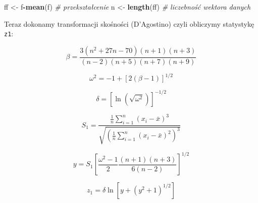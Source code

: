 \documentclass[polish,]{book}
\newenvironment{Shaded}{\begin{snugshade}}{\end{snugshade}}
\newcommand{\CommentTok}[1]{\textcolor[rgb]{0.56,0.35,0.01}{\textit{#1}}}
\newcommand{\KeywordTok}[1]{\textcolor[rgb]{0.13,0.29,0.53}{\textbf{#1}}}
\newcommand{\NormalTok}[1]{#1}
\newcommand{\OperatorTok}[1]{\textcolor[rgb]{0.81,0.36,0.00}{\textbf{#1}}}
\newcommand{\StringTok}[1]{\textcolor[rgb]{0.31,0.60,0.02}{#1}}
\begin{document}
\begin{Shaded}
\begin{Highlighting}[]
\NormalTok{ff <-}\StringTok{ }\NormalTok{f}\OperatorTok{-}\KeywordTok{mean}\NormalTok{(f) }\CommentTok{# przekształcenie}
\NormalTok{n <-}\StringTok{ }\KeywordTok{length}\NormalTok{(ff) }\CommentTok{# liczebność wektora danych}
\end{Highlighting}
\end{Shaded}

Teraz dokonamy transformacji skośności (D'Agostino) czyli obliczymy statystykę \texttt{z1}:

\begin{equation}
\beta=\frac{3(n^2+27n-70)(n+1)(n+3)}{(n-2)(n+5)(n+7)(n+9)}
\label{eq:wz111}
\end{equation}

\begin{equation}
\omega^2=-1+\left[2(\beta-1)\right]^{1/2}
\label{eq:wz112}
\end{equation}

\begin{equation}
\delta=\left[\ln\left(\sqrt{\omega^2}\right)\right]^{-1/2}
\label{eq:wz113}
\end{equation}

\begin{equation}
S_1=\frac{\frac{1}{n}\sum_{i=1}^{n}(x_i-\bar{x})^3}{\sqrt{\left(\frac{1}{n}\sum_{i=1}^{n}(x_i-\bar{x})^2\right)^3}}
\label{eq:wz114}
\end{equation}

\begin{equation}
y=S_1\left[\frac{\omega^2-1}{2}\frac{(n+1)(n+3)}{6(n-2)}\right]^{1/2}
\label{eq:wz115}
\end{equation}

\begin{equation}
z_1=\delta\ln\left[y+(y^2+1)^{1/2}\right]
\label{eq:wz116}
\end{equation}
\end{document}
